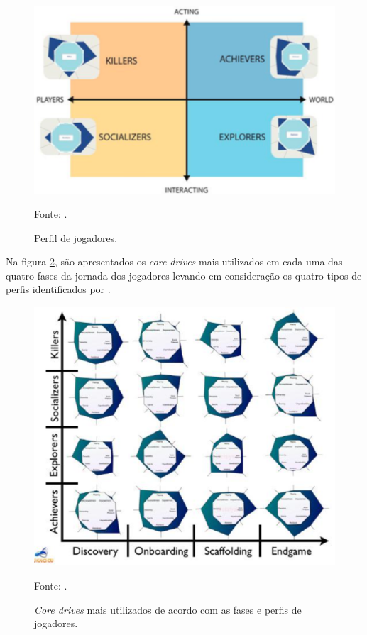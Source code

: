 \begin{figure}[h]
	\centering
	\includegraphics[keepaspectratio=true,scale=0.6]{figuras/perfiljogadores.png}
	\caption{Perfil de jogadores.}
	Fonte: \cite{chou2017actionable}.
	\label{perfiljogadores}
\end{figure}
 
Na figura \ref{nivel3}, são apresentados os \textit{core drives} mais utilizados em cada uma das quatro fases da jornada dos jogadores levando em
consideração os quatro tipos de perfis identificados por .

\begin{figure}[h]
	\centering
	\includegraphics[keepaspectratio=true,scale=0.5]{figuras/nivel3.png}
	\caption{\textit{Core drives} mais utilizados de acordo com as fases e perfis de jogadores.}
	Fonte: \cite{chou2017actionable}.
	\label{nivel3}
\end{figure}

